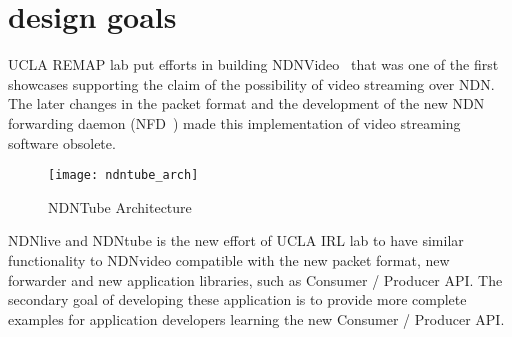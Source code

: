 


\vspace{0.3cm}
\section{design goals} %
\label{sec:design_goals}
UCLA REMAP lab put efforts in building NDNVideo~\cite{ndnvideo} that was one of the first showcases supporting the claim of the possibility of video streaming over NDN. The later changes in the packet format and the development of the new NDN forwarding daemon (NFD~\cite{nfd-guide}) made this implementation of video streaming software obsolete. 

\begin{figure*}[htbp]
  \centering
  \texttt{[image: ndntube\_arch]}
  \caption{NDNTube Architecture}
  \label{fig:ndntube_arch}
\end{figure*}

NDNlive and NDNtube is the new effort of UCLA IRL lab to have similar functionality to NDNvideo compatible with the new packet format, new forwarder and new application libraries, such as Consumer / Producer API. The secondary goal of developing these application is to provide more complete examples for application developers learning the new Consumer / Producer API.

